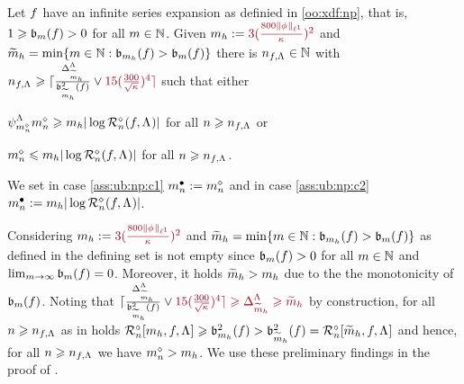 \begin{as}\label{ass:ub:np} Let $\xdf$  have an infinite series expansion
  as definied in \ref{oo:xdf:np}, that is, $1\geq \bias(\xdf)>0$ for all $\Di\in\Nz$.
Given   $\Di_{\ydf}:=\dr3(\tfrac{800\Vnormlp[1]{\fydf}}{\cpen})^2$ and
$\tDi_{\ydf}=\min\{\Di\in\Nz:\bias[\Di_{\ydf}](\xdf)>\bias[\Di](\xdf)\}$
 there is $\ssY_{\xdf,\iSv}\in\Nz$ with
$\ssY_{\xdf,\iSv}\geq\ceil{\tfrac{\DipenSv[\tDi_{\ydf}]}{\bias[\tDi_{\ydf}]^2(\xdf)}\vee\dr15(\tfrac{300}{\sqrt{\cpen}})^4}$
  such that either \begin{inparaenum}[i]\renewcommand{\theenumi}{\dgrau\rm(\alph{enumi})}\item\label{ass:ub:np:c1}
$\cmiSv[\aDi{\ssY}]\aDi{\ssY}\geq \Di_{\ydf}|\log\hRa{\xdf,\iSv}|$ 
for all
$\ssY\geq{\ssY}_{\xdf,\iSv}$ or \item\label{ass:ub:np:c2}  
$\aDi{\ssY}\leq  \Di_{\ydf}|\log\hRa{\xdf,\iSv}|$ for all
$\ssY\geq{\ssY}_{\xdf,\iSv}$.
\end{inparaenum}
We set in case \ref{ass:ub:np:c1}  $\sDi{\ssY}:=\aDi{\ssY}$ and  in case \ref{ass:ub:np:c2}  $\sDi{\ssY}:= \Di_{\ydf}|\log\hRa{\xdf,\iSv}|$.
\end{as}
\begin{rmk}\label{rem:ass:ub:np}
Considering $\Di_{\ydf}:=\dr3(\tfrac{800\Vnormlp[1]{\fydf}}{\cpen})^2$ and
$\tDi_{\ydf}=\min\{\Di\in\Nz:\bias[\Di_{\ydf}](\xdf)>\bias[\Di](\xdf)\}$
as defined in  the defining set is not empty since $\bias[\Di](\xdf)>0$ for all
$\Di\in\Nz$ and $\lim_{\Di\to\infty}\bias[\Di](\xdf)=0$. Moreover, it
holds $\tDi_{\ydf}>\Di_{\ydf}$ due to the the monotonicity of
$\bias(\xdf)$. Noting that 
$\ceil{\tfrac{\DipenSv[\tDi_{\ydf}]}{\bias[\tDi_{\ydf}]^2(\xdf)}\vee\dr15(\tfrac{300}{\sqrt{\cpen}})^4}\geq \DipenSv[\tDi_{\ydf}]\geq\tDi_{\ydf}$ by construction,
for all $\ssY\geq\ssY_{\xdf,\iSv}$ as in  holds 
$\oRaDi{\Di_{\ydf},\xdf,\iSv}\geq\bias[\Di_{\ydf}]^2(\xdf)>\bias[\tDi_{\ydf}]^2(\xdf)%
=\oRaDi{\tDi_{\ydf},\xdf,\iSv}$
and hence, for all
$\ssY\geq\ssY_{\xdf,\iSv}$ we have $\aDi{\ssY}>
\Di_{\ydf}$.
We use these preliminary findings in the proof of .  
\end{rmk}
